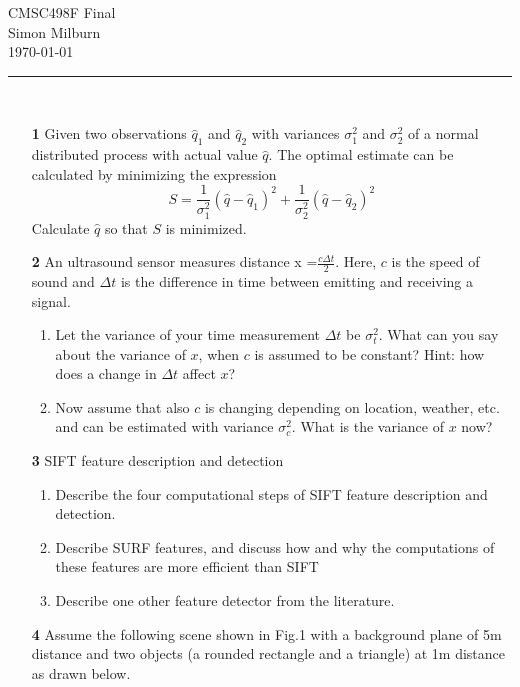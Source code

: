 \documentclass[11pt]{article}
\begin{document}
\begingroup  
  \centering
  \LARGE CMSC498F Final\\[.5em]
  \large Simon Milburn\\[.5em]
  \large \today\\[.5em]
  \noindent\rule[0.5ex]{\linewidth}{1pt}
   \large \\ [2em]
\endgroup

	\begin{enumerate}
	
	\item[\textbf{1}] 
		Given two observations $\hat{q}_1$ and $\hat{q}_2$ with variances 		
		$\sigma_1^2$ and $\sigma_2^2$ of a normal distributed process
		with actual value $\hat{q}$. The optimal estimate can be calculated by minimizing the expression
		\[
   			 S = \frac{1}{\sigma_1^2}(\hat{q}-\hat{q}_1)^2 +  \frac{1}{\sigma_2^2}(\hat{q}-\hat{q}_2)^2
		\]
		Calculate $\hat{q}$ so that $S$ is minimized.
		
	\item[\textbf{2}] 
		 An ultrasound sensor measures distance x =$\frac{c\Delta t}{2}$. Here, $c$ is the speed of sound and $\Delta t$ is the
		difference in time between emitting and receiving a signal.
		\begin{enumerate} 
			\item Let the variance of your time measurement $\Delta t$ be $\sigma_t^2$. What can you say about the 	
			variance of $x$, when $c$ is assumed to be constant? Hint: how does a change in $\Delta t$ affect $x$?
			
			\item Now assume that also $c$ is changing depending on location, weather, etc. and can be estimated
			with variance $\sigma_c^2$. What is the variance of $x$ now?
		\end{enumerate}
		
	\item[\textbf{3}] 
		 SIFT feature description and detection
		\begin{enumerate} 
			\item Describe the four computational steps of SIFT feature description and detection.
			\item Describe SURF features, and discuss how and why the computations of these features are
			more efficient than SIFT
			\item Describe one other feature detector from the literature.
		\end{enumerate}
		
	\item[\textbf{4}] 
		Assume the following scene shown in Fig.1 with a background plane of 5m distance and two
		objects (a rounded rectangle and a triangle) at 1m distance as drawn below.
		

\end{enumerate}
\end{document}

